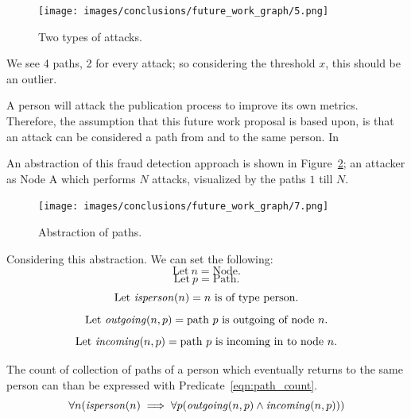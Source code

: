 \documentclass{ou-report}
\begin{document}
\begin{figure}[H]
    \centering
    \texttt{[image: images/conclusions/future\_work\_graph/5.png]}
    \caption{Two types of attacks.}
    \label{fig:graph_5}
\end{figure}

We see 4 paths, 2 for every attack; so considering the threshold $x$, this 
should be an outlier. 

A person will attack the publication process to improve its own metrics.
Therefore, the assumption that this future work proposal is based upon, is
that an attack can be considered a path from and to the 
same person. In 

An abstraction of this fraud detection approach is shown in 
Figure~\ref{fig:graph_7}; an attacker as Node A which performs $N$
attacks, visualized by the paths $1$ till $N$.

\begin{figure}[H]
    \centering
    \texttt{[image: images/conclusions/future\_work\_graph/7.png]}
    \caption{Abstraction of paths.}
    \label{fig:graph_7}
\end{figure}

\newcommand{\incoming}{\mi{incoming}}
\newcommand{\outgoing}{\mi{outgoing}}
\newcommand{\isperson}{\mi{isperson}}
\newcommand{\isaffiliation}{\mi{isaffiliation}}
\newcommand{\isjournal}{\mi{isjournal}}

Considering this abstraction. We can set the following:
\[ \text{Let}\ n=\text{Node}. \] 
\[ \text{Let}\ p=\text{Path}. \]
\[ \text{Let}\ \isperson(n)=n\text{ is of type person.} \]
\[ \text{Let}\ \outgoing(n, p)=\text{path }p\text{ is outgoing of node }n\text{.} \]
\[ \text{Let}\ \incoming(n, p)=\text{path }p\text{ is incoming in to node }n\text{.} \]

The count of collection of paths of a person which eventually returns to 
the same person can than be expressed with Predicate~\ref{eqn:path_count}.
\begin{equation}
\label{eqn:path_count}
\forall n (\isperson(n) \implies \forall p(\outgoing(n, p) \land \incoming(n, p)))
\end{equation}
\end{document}
